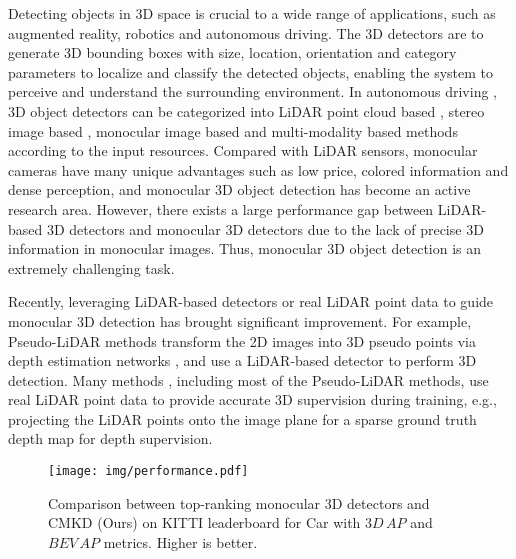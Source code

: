 \documentclass[runningheads]{llncs}
\begin{document}
Detecting objects in 3D space is crucial to a wide range of applications, such as augmented reality, robotics and autonomous driving. The 3D detectors are to generate 3D bounding boxes with size, location, orientation and category parameters to localize and classify the detected objects, enabling the system to perceive and understand the surrounding environment.
In autonomous driving \cite{KITTI,Waymo,nuscenes}, 3D object detectors can be categorized into LiDAR point cloud based \cite{voxelrcnn,pvrcnn,pointrcnn}, stereo image based \cite{stereorcnn,rt3dstereo,disprcnn}, monocular image based \cite{MonoRCNN,monogrnet,luo2021m3dssd} and multi-modality based methods \cite{joint3d,clocs} according to the input resources. 
Compared with LiDAR sensors, monocular cameras have many unique advantages such as low price, colored information and dense perception, and monocular 3D object detection has become an active research area.
However, there exists a large performance gap between LiDAR-based 3D detectors and monocular 3D detectors due to the lack of precise 3D information in monocular images.
Thus, monocular 3D object detection is an extremely challenging task.

Recently, leveraging LiDAR-based detectors or real LiDAR point data to guide monocular 3D detection has brought significant improvement.
For example, Pseudo-LiDAR methods \cite{PL,monopl,AMOD} transform the 2D images into 3D pseudo points via depth estimation networks \cite{DORN,bts}, and use a LiDAR-based detector \cite{fpointnet,AVOD} to perform 3D detection.
Many methods \cite{PL,monopl,AMOD,CADDN,dd3d}, including most of the Pseudo-LiDAR methods, use real LiDAR point data to provide accurate 3D supervision during training, e.g., projecting the LiDAR points onto the image plane for a sparse ground truth depth map for depth supervision.

\begin{figure*}[t]
  \centering
   \texttt{[image: img/performance.pdf]}
   \caption{Comparison between top-ranking monocular 3D detectors and CMKD (Ours) on KITTI leaderboard \cite{KITTI} for Car with $3D\,AP$ and $BEV\,AP$ metrics. Higher is better.}
   \label{fig:performance}
\end{figure*}
\end{document}
